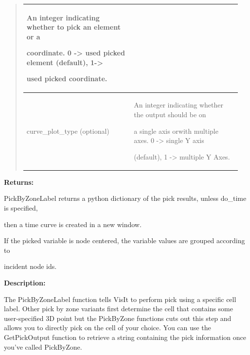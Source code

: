 \documentclass[letterpaper,10pt,english]{sphinxmanual}
\begin{document}
\begin{quote}
\begin{tabular}{|p{0.475\linewidth}|p{0.475\linewidth}|}
\begin{DUlineblock}{0em}
\item[] An integer indicating whether to pick an element or a
\item[] coordinate. 0 -\textgreater{} used picked element (default), 1-\textgreater{}
\item[] used picked coordinate.
\end{DUlineblock}
\\
\hline
curve\_plot\_type (optional)
 & 
\begin{DUlineblock}{0em}
\item[] An integer indicating whether the output should be on
\item[] a single axis orwith multiple axes. 0 -\textgreater{} single Y axis
\item[] (default), 1 -\textgreater{} multiple Y Axes.
\end{DUlineblock}
\\
\hline\end{tabular}

\end{quote}

\begin{DUlineblock}{0em}
\item[] 
\item[] \textbf{Returns:}
\item[] PickByZoneLabel returns a python dictionary of the pick results, unless do\_time is specified,
\item[] then a time curve is created in a new window.
\item[] If the picked variable is node centered, the variable values are grouped according to
\item[] incident node ids.
\item[] 
\item[] \textbf{Description:}
\item[] The PickByZoneLabel function tells VisIt to perform pick using a specific cell
label. Other pick by zone variants first determine the
cell that contains some user-specified 3D point but the PickByZone
functions cuts out this step and allows you to directly pick on the cell of
your choice. You can use the GetPickOutput function to retrieve a string
containing the pick information once you've called PickByZone.
\end{DUlineblock}

\begin{DUlineblock}{0em}
\item[] 
\end{DUlineblock}
\end{document}
